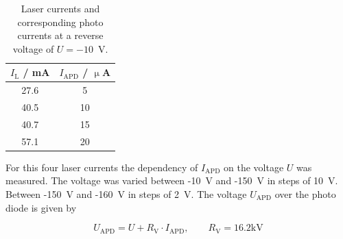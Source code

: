 \begin{table}%
\centering
\caption{Laser currents and corresponding photo currents at a reverse voltage of $U = -10$~V.}


\begin{tabular}{cc}

\toprule
$I_{\mathrm{L}}$ / mA	&	$I_{\mathrm{APD}}$ / $\upmu$A\\

\midrule
27.6 & 5\\
40.5 & 10\\
40.7 & 15\\
57.1 & 20\\

\bottomrule 
\end{tabular}
\label{tab:T3_values}
\end{table}

For this four laser currents the dependency of $I_{\mathrm{APD}}$ on the voltage $U$ was measured. The voltage was varied between -10~V and -150~V in steps of 10~V. Between -150~V and -160~V in steps of 2~V. The voltage $U_{\mathrm{APD}}$ over the photo diode is given by 

\begin{equation}
U_{\mathrm{APD}} = U + R_{\mathrm{V}}\cdot I_{\mathrm{APD}}, \qquad  R_{\mathrm{V}} = 16.2 \mathrm{kV}
\label{eq:}
\end{equation}
